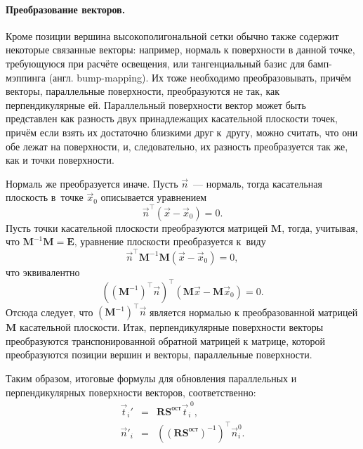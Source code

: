 \documentclass[a4paper, 14pt, titlepage]{extarticle}
\newcommand{\eng}[1]{{\English #1}}
\newcommand{\vect}[1]{\vec{#1}} %
\newcommand{\matx}[1]{\mathbf{#1}} %
\newcommand{\transposed}{\top} %
\begin{document}
        \paragraph{Преобразование векторов.}
        Кроме позиции вершина высокополигональной сетки обычно также содержит некоторые связанные векторы:
        например, нормаль к поверхности в данной точке, требующуюся при расчёте освещения, или
        тангенциальный базис для бамп-мэппинга (англ. \eng{bump-mapping}). Их тоже необходимо
        преобразовывать, причём векторы, параллельные поверхности, преобразуются не так, как
        перпендикулярные ей. Параллельный поверхности вектор может быть представлен как разность двух
        принадлежащих касательной плоскости точек, причём если взять их достаточно близкими друг
        к~другу, можно считать, что они обе лежат на поверхности, и, следовательно, их разность
        преобразуется так же, как и точки поверхности.

        Нормаль же преобразуется иначе. Пусть $\vect n$~---
        нормаль, тогда касательная плоскость в~точке $\vect{x}_0$ описывается уравнением
        \[
        \vect{n}^\transposed (\vect x - \vect{x}_0) = 0.
        \]
        Пусть точки касательной плоскости преобразуются матрицей $\matx M$, тогда, учитывая, что
        $\matx{M}^{-1} \matx{M} = \matx{E}$, уравнение плоскости преобразуется к~виду
        \[
          \vect{n}^\transposed \matx{M}^{-1} \matx{M} (\vect x - \vect{x}_0) = 0,
        \]
        что эквивалентно
        \[
           \left( (\matx{M}^{-1})^\transposed \vect{n} \right)^\transposed (\matx{M} \vect x - \matx{M} \vect{x}_0) = 0.
        \]
        Отсюда следует, что $(\matx{M}^{-1})^\transposed \vect{n}$ является нормалью к преобразованной
        матрицей $\matx M$ касательной плоскости. Итак, перпендикулярные поверхности векторы
        преобразуются транспонированной обратной матрицей к матрице, которой преобразуются позиции
        вершин и векторы, параллельные поверхности.

        Таким образом, итоговые формулы для обновления параллельных и перпендикулярных поверхности
        векторов, соответственно:
        \begin{eqnarray}
          \vect{t}_i\!' & = & \matx{R} \matx{S}^{ост} \vect{t}^{\;0}_i, \label{eq:tangent_vectors} \\
          \vect{n}'_i & = & \left(\left(\matx{R} \matx{S}^{ост}\right)^{-1}\right)^\transposed \vect{n}^0_i. \label{eq:normal_vectors}
        \end{eqnarray}
\end{document}
